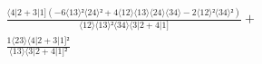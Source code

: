 \documentclass[varwidth, border=5pt]{standalone}
\begin{document}
\begin{my}
$\begin{gathered}
\scriptscriptstyle\frac{⟨4|2+3|1](-6⟨13⟩²⟨24⟩²+4⟨12⟩⟨13⟩⟨24⟩⟨34⟩-2⟨12⟩²⟨34⟩²)}{⟨12⟩⟨13⟩²⟨34⟩⟨3|2+4|1]} +\\
\scriptscriptstyle\frac{1⟨23⟩⟨4|2+3|1]²}{⟨13⟩⟨3|2+4|1]²} \phantom{+}
\end{gathered}$
\end{my}
\end{document}
